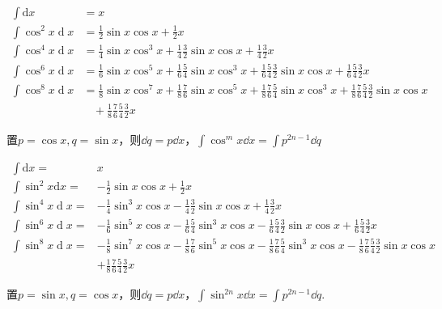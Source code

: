 \begin{theorem}
\vspace{-15pt}
\begin{align*}
\int\mathrm{d}x&=x\\
\int\cos^2x\operatorname{d}x&=\frac{1}{2}\sin x\cos x+\frac{1}{2}x\\
\int\cos^4x\operatorname{d}x&=\frac{1}{4}\sin x\cos^{3}x+\frac{1}{4}\frac{3}{2}\sin x\cos x+\frac{1}{4}\frac{3}{2}x\\
\int\cos^6x\operatorname{d}x&=\frac{1}{6}\sin x\cos^5x+\frac{1}{6}\frac{5}{4}\sin x\cos^3x+\frac{1}{6}\frac{5}{4}\frac{3}{2}\sin x\cos x+\frac{1}{6}\frac{5}{4}\frac{3}{2}x\\
\int\cos^8x\operatorname{d}x&=\frac{1}{8}\sin x\cos^7x+\frac{1}{8}\frac{7}{6}\sin x\cos^5x+\frac{1}{8}\frac{7}{6}\frac{5}{4}\sin x\cos^3x+\frac{1}{8}\frac{7}{6}\frac{5}{4}\frac{3}{2}\sin x\cos x\\
&~~~~+\frac{1}{8}\frac{7}{6}\frac{5}{4}\frac{3}{2}x
\end{align*}
\end{theorem}
置$p=\cos x,q=\sin x$，则$\dd q=p\dd x$，$\int\cos^mx\dd x=\int p^{2n-1}\dd q$

\begin{theorem}
    \vspace{-15pt}
    \begin{align*}
        \int\mathrm{d}x=&x\\
        \int\sin^2x\mathrm{d}x=&-\frac{1}{2}\sin x\cos x+\frac{1}{2}x\\
        \int\sin^4x\operatorname{d}x=&-\frac{1}{4}\sin^3x\cos x-\frac{1}{4}\frac{3}{2}\sin x\cos x+\frac{1}{4}\frac{3}{2}x\\
        \int\sin^6x\operatorname{d}x=&-\frac{1}{6}\sin^5x\cos x-\frac{1}{6}\frac{5}{4}\sin^3x\cos x-\frac{1}{6}\frac{5}{4}\frac{3}{2}\sin x\cos x+\frac{1}{6}\frac{5}{4}\frac{3}{2}x\\
        \int\sin^8x\operatorname{d}x=&-\frac{1}{8}\sin^7x\cos x-\frac{1}{8}\frac{7}{6}\sin^5x\cos x-\frac{1}{8}\frac{7}{6}\frac{5}{4}\sin^3x\cos x-\frac{1}{8}\frac{7}{6}\frac{5}{4}\frac{3}{2}\sin x\cos x\\
        &+\frac{1}{8}\frac{7}{6}\frac{5}{4}\frac{3}{2}x
    \end{align*}
\end{theorem}
置$p=\sin x,q=\cos x$，则$\dd q=p\dd x$，$\int\sin^{2n}x\dd x=\int p^{2n-1}\dd q$.

